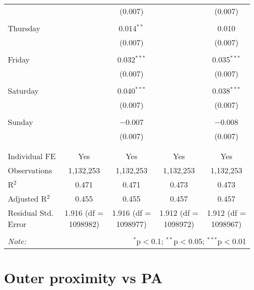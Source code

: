 \documentclass[
]{article}
\begin{document}
\begin{table}[!htbp]
{\begin{tabular}{@{\extracolsep{5pt}}lcccc}
  &  & (0.007) &  & (0.007) \\ 
  & & & & \\ 
 Thursday &  & 0.014$^{**}$ &  & 0.010 \\ 
  &  & (0.007) &  & (0.007) \\ 
  & & & & \\ 
 Friday &  & 0.032$^{***}$ &  & 0.035$^{***}$ \\ 
  &  & (0.007) &  & (0.007) \\ 
  & & & & \\ 
 Saturday &  & 0.040$^{***}$ &  & 0.038$^{***}$ \\ 
  &  & (0.007) &  & (0.007) \\ 
  & & & & \\ 
 Sunday &  & $-$0.007 &  & $-$0.008 \\ 
  &  & (0.007) &  & (0.007) \\ 
  & & & & \\ 
\hline \\[-1.8ex] 
Individual FE & Yes & Yes & Yes & Yes \\ 
Observations & 1,132,253 & 1,132,253 & 1,132,253 & 1,132,253 \\ 
R$^{2}$ & 0.471 & 0.471 & 0.473 & 0.473 \\ 
Adjusted R$^{2}$ & 0.455 & 0.455 & 0.457 & 0.457 \\ 
Residual Std. Error & 1.916 (df = 1098982) & 1.916 (df = 1098977) & 1.912 (df = 1098972) & 1.912 (df = 1098967) \\ 
\hline 
\hline \\[-1.8ex] 
\textit{Note:}  & \multicolumn{4}{r}{$^{*}$p$<$0.1; $^{**}$p$<$0.05; $^{***}$p$<$0.01} \\ 
\end{tabular}
} 
\end{table} 
\newpage
\section{Outer proximity vs PA}
\end{document}
